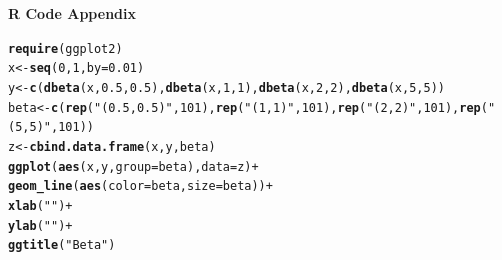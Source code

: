 \documentclass[12pt]{article}\usepackage[]{graphicx}\usepackage[]{color}
\makeatletter
\newcommand{\hlnum}[1]{\textcolor[rgb]{0.686,0.059,0.569}{#1}}%
\newcommand{\hlstr}[1]{\textcolor[rgb]{0.192,0.494,0.8}{#1}}%
\newcommand{\hlopt}[1]{\textcolor[rgb]{0,0,0}{#1}}%
\newcommand{\hlstd}[1]{\textcolor[rgb]{0.345,0.345,0.345}{#1}}%
\newcommand{\hlkwb}[1]{\textcolor[rgb]{0.69,0.353,0.396}{#1}}%
\newcommand{\hlkwc}[1]{\textcolor[rgb]{0.333,0.667,0.333}{#1}}%
\newcommand{\hlkwd}[1]{\textcolor[rgb]{0.737,0.353,0.396}{\textbf{#1}}}%
\newenvironment{kframe}{%
 \def\at@end@of@kframe{}%
 \ifinner\ifhmode%
  \def\at@end@of@kframe{\end{minipage}}%
  \begin{minipage}{\columnwidth}%
 \fi\fi%
 \def\FrameCommand##1{\hskip\@totalleftmargin \hskip-\fboxsep
 \colorbox{shadecolor}{##1}\hskip-\fboxsep
     \hskip-\linewidth \hskip-\@totalleftmargin \hskip\columnwidth}%
 \MakeFramed {\advance\hsize-\width
   \@totalleftmargin\z@ \linewidth\hsize
   \@setminipage}}%
 {\par\unskip\endMakeFramed%
 \at@end@of@kframe}
\newenvironment{knitrout}{}{} %
\makeatother
\begin{document}
\begin{doublespacing}
\begin{enumerate}
\end{enumerate}

\end{doublespacing}

{\bf \Large R Code Appendix}
\begin{knitrout}\footnotesize
{}\color{fgcolor}\begin{kframe}
\begin{alltt}
\hlkwd{require}\hlstd{(ggplot2)}
\hlstd{x} \hlkwb{<-} \hlkwd{seq}\hlstd{(}\hlnum{0}\hlstd{,}\hlnum{1}\hlstd{,} \hlkwc{by}\hlstd{=}\hlnum{0.01}\hlstd{)}
\hlstd{y} \hlkwb{<-} \hlkwd{c}\hlstd{(}\hlkwd{dbeta}\hlstd{(x,}\hlnum{0.5}\hlstd{,}\hlnum{0.5}\hlstd{),} \hlkwd{dbeta}\hlstd{(x,}\hlnum{1}\hlstd{,}\hlnum{1}\hlstd{),} \hlkwd{dbeta}\hlstd{(x,}\hlnum{2}\hlstd{,}\hlnum{2}\hlstd{),} \hlkwd{dbeta}\hlstd{(x,}\hlnum{5}\hlstd{,}\hlnum{5}\hlstd{))}
\hlstd{beta} \hlkwb{<-} \hlkwd{c}\hlstd{(}\hlkwd{rep}\hlstd{(}\hlstr{"(0.5, 0.5)"}\hlstd{,} \hlnum{101}\hlstd{),} \hlkwd{rep}\hlstd{(}\hlstr{"(1, 1)"}\hlstd{,} \hlnum{101}\hlstd{),} \hlkwd{rep}\hlstd{(}\hlstr{"(2, 2)"}\hlstd{,} \hlnum{101}\hlstd{),} \hlkwd{rep}\hlstd{(}\hlstr{"(5, 5)"}\hlstd{,} \hlnum{101}\hlstd{))}
\hlstd{z} \hlkwb{<-} \hlkwd{cbind.data.frame}\hlstd{(x,y, beta)}
\hlkwd{ggplot}\hlstd{(}\hlkwd{aes}\hlstd{(x, y,} \hlkwc{group}\hlstd{=beta),} \hlkwc{data}\hlstd{=z)} \hlopt{+}
  \hlkwd{geom_line}\hlstd{(}\hlkwd{aes}\hlstd{(}\hlkwc{color}\hlstd{=beta,} \hlkwc{size}\hlstd{=beta))}\hlopt{+}
  \hlkwd{xlab}\hlstd{(}\hlstr{""}\hlstd{)}\hlopt{+}
  \hlkwd{ylab}\hlstd{(}\hlstr{""}\hlstd{)}\hlopt{+}
  \hlkwd{ggtitle}\hlstd{(}\hlstr{"Beta"}\hlstd{)}
\end{alltt}
\end{kframe}
\end{knitrout}
\end{document}
